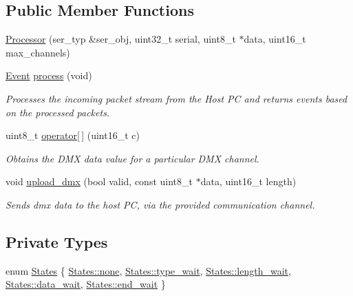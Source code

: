 \subsection*{Public Member Functions}
\begin{DoxyCompactItemize}
\item 
\hyperlink{classDMXPro_1_1Processor_a1fc149f6c2f24a8fb8e2562c253e0ddf}{Processor} (ser\+\_\+typ \&ser\+\_\+obj, uint32\+\_\+t serial, uint8\+\_\+t $\ast$data, uint16\+\_\+t max\+\_\+channels)
\item 
\hyperlink{namespaceDMXPro_a0b4335b3ed2abbd803e6d33c54d6ac6d}{Event} \hyperlink{classDMXPro_1_1Processor_a3391d1ac0d213bdadbed8313d15584d6}{process} (void)
\begin{DoxyCompactList}\small\item\em Processes the incoming packet stream from the Host PC and returns events based on the processed packets. \end{DoxyCompactList}\item 
uint8\+\_\+t \hyperlink{classDMXPro_1_1Processor_a93e71e87740b0464504f829297bb654f}{operator\mbox{[}$\,$\mbox{]}} (uint16\+\_\+t c)
\begin{DoxyCompactList}\small\item\em Obtains the D\+MX data value for a particular D\+MX channel. \end{DoxyCompactList}\item 
void \hyperlink{classDMXPro_1_1Processor_ae65b0e05885eb2878544e5bedcded36c}{upload\+\_\+dmx} (bool valid, const uint8\+\_\+t $\ast$data, uint16\+\_\+t length)
\begin{DoxyCompactList}\small\item\em Sends dmx data to the host PC, via the provided communication channel. \end{DoxyCompactList}\end{DoxyCompactItemize}
\subsection*{Private Types}
\begin{DoxyCompactItemize}
\item 
enum \hyperlink{classDMXPro_1_1Processor_ab5c1e3e1ccd6dd60b9e05c3438341a24}{States} \{ \newline
\hyperlink{classDMXPro_1_1Processor_ab5c1e3e1ccd6dd60b9e05c3438341a24a334c4a4c42fdb79d7ebc3e73b517e6f8}{States\+::none}, 
\hyperlink{classDMXPro_1_1Processor_ab5c1e3e1ccd6dd60b9e05c3438341a24aa166b18047c9a32d2a648dfa1b753363}{States\+::type\+\_\+wait}, 
\hyperlink{classDMXPro_1_1Processor_ab5c1e3e1ccd6dd60b9e05c3438341a24aeaa16feeea9709ce06294b39d7bb4d50}{States\+::length\+\_\+wait}, 
\hyperlink{classDMXPro_1_1Processor_ab5c1e3e1ccd6dd60b9e05c3438341a24acddf62aa8552e8b51ec4d46fd1c47f04}{States\+::data\+\_\+wait}, 
\newline
\hyperlink{classDMXPro_1_1Processor_ab5c1e3e1ccd6dd60b9e05c3438341a24a49d6255a7efb5d93ffcc2f7bbb7a5180}{States\+::end\+\_\+wait}
 \}
\end{DoxyCompactItemize}
